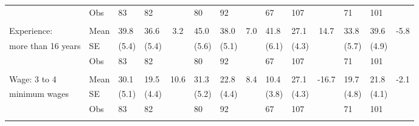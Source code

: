 \documentclass[
	article,			%
	12pt,				%
	oneside,			%
	a4paper,			%
	]{article}
\begin{document}
\begin{table}[h!]
\begin{tabular}{lp{2.335em}p{1.915em}p{2.085em}cp{1.915em}p{1.915em}cp{1.915em}p{1.915em}cp{1.915em}p{1.915em}c}
           &        Obs &         83 &         82 &            &         80 &         92 &            &         67 &        107 &            &         71 &        101 &            \\

           &            &            &            &            &            &            &            &            &            &            &            &            &            \\

Experience:  &       Mean &       39.8 &       36.6 &        3.2 &       45.0 &       38.0 &        7.0 &       41.8 &       27.1 &     14.7 &       33.8 &       39.6 &       -5.8 \\

more than 16 years &         SE &      (5.4) &      (5.4) &            &      (5.6) &      (5.1) &            &      (6.1) &      (4.3) &            &      (5.7) &      (4.9) &            \\

           &        Obs &         83 &         82 &            &         80 &         92 &            &         67 &        107 &            &         71 &        101 &            \\

           &            &            &            &            &            &            &            &            &            &            &            &            &            \\

Wage: 3 to 4  &       Mean &       30.1 &       19.5 &       10.6 &       31.3 &       22.8 &        8.4 &       10.4 &       27.1 &   -16.7 &       19.7 &       21.8 &       -2.1 \\

minimum wages &         SE &      (5.1) &      (4.4) &            &      (5.2) &      (4.4) &            &      (3.8) &      (4.3) &            &      (4.8) &      (4.1) &            \\

           &        Obs &         83 &         82 &            &         80 &         92 &            &         67 &        107 &            &         71 &        101 &            \\

           &            &            &            &            &            &            &            &            &            &            &            &            &            \\


\end{tabular}
\end{table}
\end{document}
